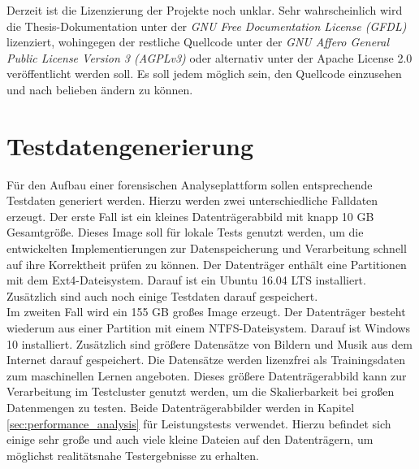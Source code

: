 \noindent
Derzeit ist die Lizenzierung der Projekte noch unklar. Sehr wahrscheinlich wird die Thesis-Dokumentation unter der \textit{GNU Free Documentation License (GFDL)} lizenziert, wohingegen der restliche Quellcode unter der \textit{GNU Affero General Public License Version 3 (AGPLv3)} oder alternativ unter der Apache License 2.0 veröffentlicht werden soll. Es soll jedem möglich sein, den Quellcode einzusehen und nach belieben ändern zu können.\\

\section{Testdatengenerierung}
\label{testdatacreation}
Für den Aufbau einer forensischen Analyseplattform sollen entsprechende Testdaten generiert werden. Hierzu werden zwei unterschiedliche Falldaten erzeugt. Der erste Fall ist ein kleines Datenträgerabbild mit knapp 10 GB Gesamtgröße. Dieses Image soll für lokale Tests genutzt werden, um die entwickelten Implementierungen zur Datenspeicherung und Verarbeitung schnell auf ihre Korrektheit prüfen zu können. Der Datenträger enthält eine Partitionen mit dem Ext4-Dateisystem. Darauf ist ein Ubuntu 16.04 LTS installiert. Zusätzlich sind auch noch einige Testdaten darauf gespeichert.\\

\noindent
Im zweiten Fall wird ein 155 GB großes Image erzeugt. Der Datenträger besteht wiederum aus einer Partition mit einem NTFS-Dateisystem. Darauf ist Windows 10 installiert. Zusätzlich sind größere Datensätze von Bildern und Musik aus dem Internet darauf gespeichert. Die Datensätze werden lizenzfrei als Trainingsdaten zum maschinellen Lernen angeboten. Dieses größere Datenträgerabbild kann zur Verarbeitung im Testcluster genutzt werden, um die Skalierbarkeit bei großen Datenmengen zu testen. Beide Datenträgerabbilder werden in Kapitel \ref{sec:performance_analysis} für Leistungstests verwendet. Hierzu befindet sich einige sehr große und auch viele kleine Dateien auf den Datenträgern, um möglichst realitätsnahe Testergebnisse zu erhalten.